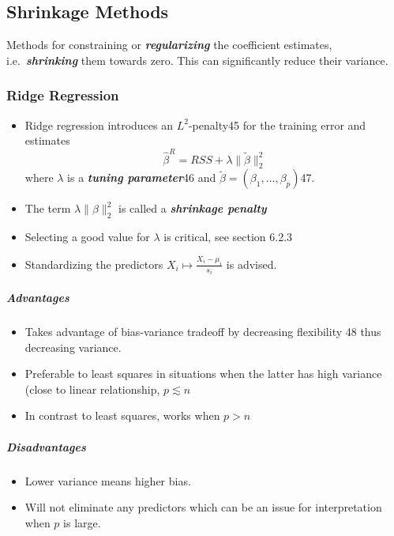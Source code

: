 \documentclass[11pt]{article}
\providecommand{\tightlist}{%
      \setlength{\itemsep}{0pt}\setlength{\parskip}{0pt}}
\begin{document}
    \hypertarget{shrinkage-methods}{%
\subsection{Shrinkage Methods}\label{shrinkage-methods}}

    Methods for constraining or \textbf{\emph{regularizing}} the coefficient
estimates, i.e.~\textbf{\emph{shrinking}} them towards zero. This can
significantly reduce their variance.

    \hypertarget{ridge-regression}{%
\subsubsection{Ridge Regression}\label{ridge-regression}}

    \begin{itemize}
\item
  Ridge regression introduces an \(L^2\)-penalty45 for the training
  error and estimates
  \[\hat{\beta}^R = RSS+\lambda\|\tilde{\beta}\|_2^2\] where \(\lambda\)
  is a \textbf{\emph{tuning parameter}}46 and
  \(\tilde{\beta} = (\beta_1, \dots, \beta_p)\)47.
\item
  The term \(\lambda\|\beta\|_2^2\) is called a \textbf{\emph{shrinkage
  penalty}}
\item
  Selecting a good value for \(\lambda\) is critical, see section 6.2.3
\item
  Standardizing the predictors \(X_i \mapsto \frac{X_i - \mu_i}{s_i}\)
  is advised.
\end{itemize}

    \hypertarget{advantages}{%
\subparagraph{Advantages}\label{advantages}}

    \begin{itemize}
\tightlist
\item
  Takes advantage of bias-variance tradeoff by decreasing flexibility 48
  thus decreasing variance.
\item
  Preferable to least squares in situations when the latter has high
  variance (close to linear relationship, \(p \lesssim n\)
\item
  In contrast to least squares, works when \(p > n\)
\end{itemize}

    \hypertarget{disadvantages}{%
\subparagraph{Disadvantages}\label{disadvantages}}

    \begin{itemize}
\tightlist
\item
  Lower variance means higher bias.
\item
  Will not eliminate any predictors which can be an issue for
  interpretation when \(p\) is large.
\end{itemize}
\end{document}
